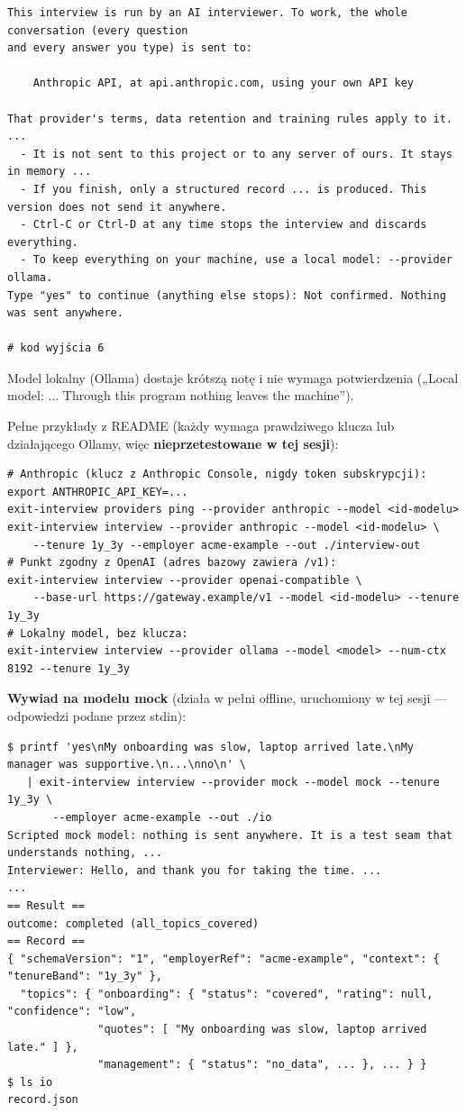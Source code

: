 {\begin{Verbatim}[fontsize=\scriptsize,frame=single,framesep=2mm]
This interview is run by an AI interviewer. To work, the whole conversation (every question
and every answer you type) is sent to:

    Anthropic API, at api.anthropic.com, using your own API key

That provider's terms, data retention and training rules apply to it. ...
  - It is not sent to this project or to any server of ours. It stays in memory ...
  - If you finish, only a structured record ... is produced. This version does not send it anywhere.
  - Ctrl-C or Ctrl-D at any time stops the interview and discards everything.
  - To keep everything on your machine, use a local model: --provider ollama.
Type "yes" to continue (anything else stops): Not confirmed. Nothing was sent anywhere.
                                                                      # kod wyjścia 6
\end{Verbatim}

Model lokalny (Ollama) dostaje krótszą notę i nie wymaga potwierdzenia
(„Local model: ... Through this program nothing leaves the machine”).

Pełne przykłady z README (każdy wymaga prawdziwego klucza lub działającego
Ollamy, więc \textbf{nieprzetestowane w tej sesji}):

\begin{Verbatim}[fontsize=\scriptsize,frame=single,framesep=2mm]
# Anthropic (klucz z Anthropic Console, nigdy token subskrypcji):
export ANTHROPIC_API_KEY=...
exit-interview providers ping --provider anthropic --model <id-modelu>
exit-interview interview --provider anthropic --model <id-modelu> \
    --tenure 1y_3y --employer acme-example --out ./interview-out
# Punkt zgodny z OpenAI (adres bazowy zawiera /v1):
exit-interview interview --provider openai-compatible \
    --base-url https://gateway.example/v1 --model <id-modelu> --tenure 1y_3y
# Lokalny model, bez klucza:
exit-interview interview --provider ollama --model <model> --num-ctx 8192 --tenure 1y_3y
\end{Verbatim}

\textbf{Wywiad na modelu mock} (działa w pełni offline, uruchomiony w tej
sesji --- odpowiedzi podane przez stdin):

\begin{Verbatim}[fontsize=\scriptsize,frame=single,framesep=2mm]
$ printf 'yes\nMy onboarding was slow, laptop arrived late.\nMy manager was supportive.\n...\nno\n' \
   | exit-interview interview --provider mock --model mock --tenure 1y_3y \
       --employer acme-example --out ./io
Scripted mock model: nothing is sent anywhere. It is a test seam that understands nothing, ...
Interviewer: Hello, and thank you for taking the time. ...
...
== Result ==
outcome: completed (all_topics_covered)
== Record ==
{ "schemaVersion": "1", "employerRef": "acme-example", "context": { "tenureBand": "1y_3y" },
  "topics": { "onboarding": { "status": "covered", "rating": null, "confidence": "low",
              "quotes": [ "My onboarding was slow, laptop arrived late." ] },
              "management": { "status": "no_data", ... }, ... } }
$ ls io
record.json
\end{Verbatim}

}
